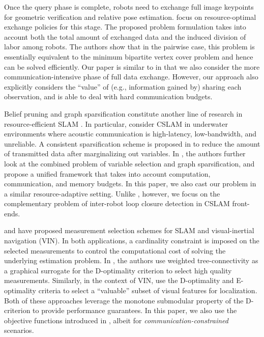 \documentclass[conference]{IEEEtran}
\begin{document}
Once the query phase is complete, robots need to exchange full image
keypoints for geometric verification and relative pose estimation.
\citet{Giamou18_ICRA} focus on resource-optimal exchange policies for this stage. The proposed problem formulation takes into account both the
total amount of exchanged data and the induced division of labor among robots.
The authors show that in the pairwise case, this problem is essentially
equivalent to the 
minimum bipartite vertex cover problem and hence can be solved
efficiently. Our paper is similar to \cite{Giamou18_ICRA} in that we also consider
the more communication-intensive phase of full data exchange. However, our approach also
explicitly considers the ``value'' of (e.g., information gained by) sharing each observation, and is able
to deal with hard communication budgets. 


Belief pruning and graph sparsification constitute another line of research in
resource-efficient SLAM \cite{kretzschmar2012, paull2015communication,
Vial2011, Huang2013}. 
In particular, \citet{paull2015communication} consider CSLAM in 
underwater environments where acoustic communication is high-latency,
low-bandwidth, and unreliable. A consistent sparsification scheme is proposed in
\cite{paull2015communication} to reduce the amount of
transmitted data after marginalizing out variables. In \cite{paull2016unified}, the authors further look at the
combined problem of variable selection and graph sparsification, and propose a
unified framework that takes into account computation, communication, and memory
budgets. 
In this paper, we also cast our
problem in a similar resource-adaptive setting. Unlike
\cite{paull2016unified}, however, we focus on the complementary problem of
inter-robot loop closure detection in CSLAM front-ends.


\citet{kasra16wafr,kasra18ijrr} and \citet{carlone2017attention} have proposed
measurement selection schemes for SLAM and 
visual-inertial navigation (VIN).
In both applications,
a cardinality constraint is imposed 
on the selected measurements
to control the computational cost of solving the underlying 
estimation problem.
In \cite{kasra18ijrr,kasra16wafr}, 
the authors use weighted tree-connectivity \cite{kasra16icra} as a
graphical surrogate for the \mbox{D-optimality} criterion 
to select high quality measurements. 
Similarly, 
in the
context of VIN, 
\citet{carlone2017attention} 
use the D-optimality and E-optimality criteria to select a ``valuable'' subset of visual features for localization.
Both of these approaches
\cite{kasra16wafr,kasra18ijrr,carlone2017attention} leverage the monotone
submodular property of the D-criterion to provide performance guarantees. In
this paper, we also use the objective functions introduced in
\cite{kasra18ijrr,kasra16wafr,carlone2017attention}, albeit for
\emph{communication-constrained} scenarios.
\end{document}
